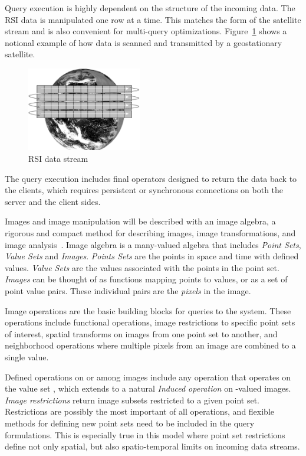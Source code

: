 \documentclass{ucdthesis}       %
\begin{document}
Query execution is highly dependent on the structure of the incoming
data.  The \ac{RSI} data is manipulated one row at a time.  This
matches the form of the satellite stream and is also convenient for
multi-query optimizations.  Figure~\ref{fig:rsi-example} shows a
notional example of how data is scanned and transmitted by a
geostationary satellite.

\begin{figure}[htb]
  \centering
  \includegraphics[width=5cm]{figs/rsi-example.fig.eps}  
  \caption{\ac{RSI} data stream}
  \label{fig:rsi-example}
\end{figure}

The query execution includes final operators designed to return the
data back to the clients, which requires persistent or synchronous
connections on both the server and the client sides.

Images and image manipulation will be described with an image algebra,
a rigorous and compact method for describing images, image
transformations, and image analysis~\cite{ritter01handb-comput}.
Image algebra is a many-valued algebra that includes \emph{Point
  Sets}, \emph{Value Sets} and \emph{Images}.  \emph{Points Sets} are
the points in space and time with defined values.  \emph{Value Sets}
are the values associated with the points in the point set.
\emph{Images} can be thought of as functions mapping points to values,
or as a set of point value pairs.  These individual pairs are the
\emph{pixels} in the image.

Image operations are the basic building blocks for queries to the
system.  These operations include functional operations, image
restrictions to specific point sets of interest, spatial transforms on
images from one point set to another, and neighborhood operations
where multiple pixels from an image are combined to a single value.

Defined operations on or among images include any operation that
operates on the value set , which extends to a natural
\emph{Induced operation} on -valued images.  \emph{Image
  restrictions} return image subsets restricted to a given point set.
Restrictions are possibly the most important of all operations, and
flexible methods for defining new point sets need to be included in
the query formulations.  This is especially true in this model where
point set restrictions define not only spatial, but also
spatio-temporal limits on incoming data streams.  
\end{document}
